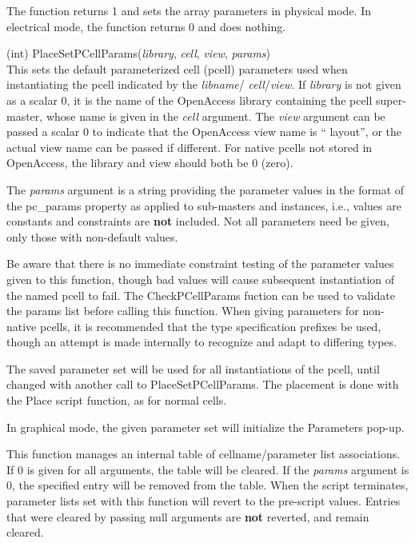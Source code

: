 \begin{description}
The function returns 1 and sets the array parameters in physical mode. 
In electrical mode, the function returns 0 and does nothing.

\item{(int) \vt PlaceSetPCellParams({\it library\/}, {\it cell\/},
{\it view\/}, {\it params\/})}\\
This sets the default parameterized cell (pcell) parameters used when
instantiating the pcell indicated by the {\it libname\/}/{\it
cell\/}/{\it view\/}.
If {\it library} is not given as a scalar 0, it is the name of the
OpenAccess library containing the pcell super-master, whose name is
given in the {\it cell} argument.  The {\it view} argument can be
passed a scalar 0 to indicate that the OpenAccess view name is ``{\vt
layout}'', or the actual view name can be passed if different.  For
{\Xic} native pcells not stored in OpenAccess, the library and view
should both be 0 (zero).

The {\it params} argument is a string providing the parameter values
in the format of the {\et pc\_params} property as applied to
sub-masters and instances, i.e., values are constants and constraints
are {\bf not} included.  Not all parameters need be given, only those
with non-default values.

Be aware that there is no immediate constraint testing of the
parameter values given to this function, though bad values will cause
subsequent instantiation of the named pcell to fail.  The {\vt
CheckPCellParams} fuction can be used to validate the params list
before calling this function.  When giving parameters for non-native
pcells, it is recommended that the type specification prefixes be
used, though an attempt is made internally to recognize and adapt to
differing types.

The saved parameter set will be used for all instantiations of the
pcell, until changed with another call to {\vt PlaceSetPCellParams}. 
The placement is done with the {\vt Place} script function, as for
normal cells.

In graphical mode, the given parameter set will initialize the {\cb
Parameters} pop-up.

This function manages an internal table of cellname/parameter list
associations.  If 0 is given for all arguments, the table will be
cleared.  If the {\it params} argument is 0, the specified entry will
be removed from the table.  When the script terminates, parameter
lists set with this function will revert to the pre-script values. 
Entries that were cleared by passing null arguments are {\bf not}
reverted, and remain cleared.


\end{description}
